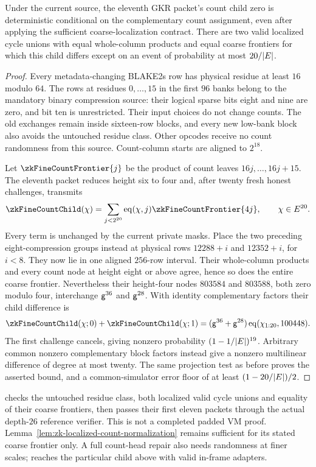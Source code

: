 \begin{proposition}\label{prop:zk-frozen-fine-count}
Under the current source, the eleventh GKR packet's count child zero is deterministic conditional on the complementary count assignment, even after applying the sufficient coarse-localization contract. There are two valid localized cycle unions with equal whole-column products and equal coarse frontiers for which this child differs except on an event of probability at most $20/|E|$.
\end{proposition}
\begin{proof}
Every metadata-changing BLAKE2s row has physical residue at least $16$ modulo $64$. The rows at residues $0,\ldots,15$ in the first $96$ banks belong to the mandatory binary compression source: their logical sparse bits eight and nine are zero, and bit ten is unrestricted. Their input choices do not change counts. The old exchanges remain inside sixteen-row blocks, and every new low-bank block also avoids the untouched residue class. Other opcodes receive no count randomness from this source. Count-column starts are aligned to $2^{18}$.

Let $\zkFineCountFrontier{j}$ be the product of count leaves $16j,\ldots,16j+15$. The eleventh packet reduces height six to four and, after twenty fresh honest challenges, transmits
\[
 \zkFineCountChild(\fc)=\sum_{j<2^{20}}\eq(\fc,j)\zkFineCountFrontier{4j},
 \qquad \fc\in\E^{20}.
\]
Every term is unchanged by the current private masks. Place the two preceding eight-compression groups instead at physical rows $12288+i$ and $12352+i$, for $i<8$. They now lie in one aligned $256$-row interval. Their whole-column products and every count node at height eight or above agree, hence so does the entire coarse frontier. Nevertheless their height-four nodes $803584$ and $803588$, both zero modulo four, interchange $\mathsf{g}^{36}$ and $\mathsf{g}^{28}$. With identity complementary factors their child difference is
\[
 \zkFineCountChild(\fc;0)+\zkFineCountChild(\fc;1)
 =(\gen^{36}+\gen^{28})\eq(\fc_{1:20},100448).
\]
The first challenge cancels, giving nonzero probability $(1-1/|E|)^{19}$. Arbitrary common nonzero complementary block factors instead give a nonzero multilinear difference of degree at most twenty. The same projection test as before proves the asserted bound, and a common-simulator error floor of at least $(1-20/|E|)/2$.
\end{proof}

 checks the untouched residue class, both localized valid cycle unions and equality of their coarse frontiers, then passes their first eleven packets through the actual depth-$26$ reference verifier. This is not a completed padded VM proof. Lemma~\ref{lem:zk-localized-count-normalization} remains sufficient for its stated coarse frontier only. A full count-head repair also needs randomness at finer scales;  reaches the particular child above with valid in-frame adapters.
